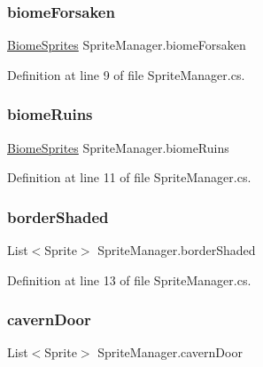 \mbox{\label{class_sprite_manager_a18f337bc067753cedff7f6be8cd6ead9}} 
\subsubsection{\texorpdfstring{biomeForsaken}{biomeForsaken}}
{\footnotesize\ttfamily \mbox{\hyperlink{class_biome_sprites}{Biome\+Sprites}} Sprite\+Manager.\+biome\+Forsaken}



Definition at line 9 of file Sprite\+Manager.\+cs.

\mbox{\label{class_sprite_manager_a178699db75afaae518b018060e713d1d}} 
\subsubsection{\texorpdfstring{biomeRuins}{biomeRuins}}
{\footnotesize\ttfamily \mbox{\hyperlink{class_biome_sprites}{Biome\+Sprites}} Sprite\+Manager.\+biome\+Ruins}



Definition at line 11 of file Sprite\+Manager.\+cs.

\mbox{\label{class_sprite_manager_a84590ce51ebbabbf1bc9178cf5171bff}} 
\subsubsection{\texorpdfstring{borderShaded}{borderShaded}}
{\footnotesize\ttfamily List$<$Sprite$>$ Sprite\+Manager.\+border\+Shaded}



Definition at line 13 of file Sprite\+Manager.\+cs.

\mbox{\label{class_sprite_manager_a0efbce48d098c815aa4706800aab65cc}} 
\subsubsection{\texorpdfstring{cavernDoor}{cavernDoor}}
{\footnotesize\ttfamily List$<$Sprite$>$ Sprite\+Manager.\+cavern\+Door}



